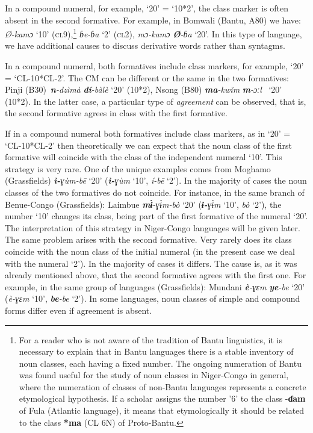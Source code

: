 \begin{enumerate}
In a compound numeral, for example, ‘20’ = ‘10*2’, the class marker is often absent in the second formative. For example, in Bomwali (Bantu, A80) we have: \textit{Ø-kamɔ} ‘10’ (\textsc{cl}9),\footnote{For a reader who is not aware of the tradition of Bantu linguistics, it is necessary to explain that in Bantu languages there is a stable inventory of noun classes, each having a fixed number. The ongoing numeration of Bantu was found useful for the study of noun classes in Niger-Congo in general, where the numeration of classes of non-Bantu languages represents a concrete etymological hypothesis. If a scholar assigns the number '6' to the class -\textbf{ɗam} of Fula (Atlantic language), it means that etymologically it should be related to the class \textbf{*ma} (CL 6N) of Proto-Bantu.}   \textit{ɓe-ɓa}  ‘2’ (\textsc{cl}2),  \textit{mɔ-kamɔ} \textbf{\textit{Ø}}\textit{-ɓa} ‘20’. In this type of language, we have additional causes to discuss derivative words rather than syntagms. 

In a compound numeral, both formatives include class markers, for example, ‘20’ = ‘CL-10*CL-2’. The CM can be different or the same in the two formatives: Pinji (B30)~\textbf{\textit{n}}\textit{-dzìmà} \textbf{\textit{dí}}\textit{-bàlè} ‘20’ (10*2), Nsong (B80) \textbf{\textit{ma}}\textit{-kw{\v{i}}m} \textbf{\textit{m}}\textit{-ɔːl}~ ‘20’ (10*2). In the latter case, a particular type of \textit{agreement} can be observed, that is, the second formative agrees in class with the first formative. 

If in a compound numeral both formatives include class markers, as in ‘20’ = ‘CL-10*CL-2’ then theoretically we can expect that the noun class of the first formative will coincide with the class of the independent numeral `10'. This strategy is very rare. One of the unique examples comes from Moghamo (Grassfields) \textbf{\textit{ì-}}\textit{ɣ{\`{u}}m-bē} ‘20’ (\textbf{\textit{ì-}}\textit{ɣ{\`{u}}m} ‘10’,  \textit{í-bē}  ‘2’).  In the majority of cases the noun classes of the two formatives do not coincide. For instance, in the same branch of Benue-Congo (Grassfields): Laimbue \textbf{\textit{m{\`{ɨ}}}}\textit{-ɣ{\'{ɨ}}m-bò} ‘20’ (\textbf{\textit{ɨ-}}\textit{ɣ{\'{ɨ}}m} ‘10', \textit{bò} ‘2’), the number `10' changes its class, being part of the first formative of the numeral `20'. The interpretation of this strategy in Niger-Congo languages will be given later. The same problem arises with the second formative. Very rarely does its class coincide with the noun class of the initial numeral (in the present case we deal with the numeral `2'). In the majority of cases it differs. The cause is, as it was already mentioned above, that the second formative agrees with the first one. For example, in the same group of languages (Grassfields): Mundani \textbf{\textit{è}}\textit{-ɣɛm} \textbf{\textit{ye}}\textit{-be} ‘20’  (\textit{è-ɣɛm} ‘10’, \textbf{\textit{be}}\textit{-be} ‘2’). In some languages, noun classes of simple and compound forms differ even if agreement is absent. 


\end{enumerate}
